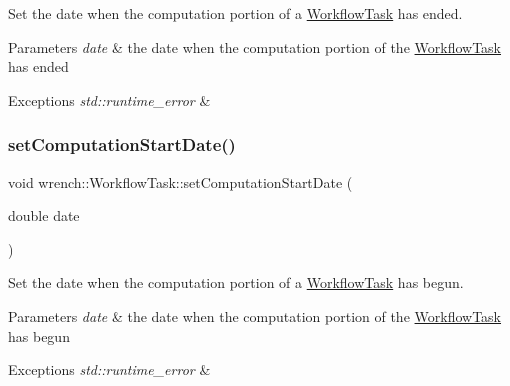 Set the date when the computation portion of a \hyperlink{classwrench_1_1_workflow_task}{Workflow\+Task} has ended. 


\begin{DoxyParams}{Parameters}
{\em date} & the date when the computation portion of the \hyperlink{classwrench_1_1_workflow_task}{Workflow\+Task} has ended \\
\hline
\end{DoxyParams}

\begin{DoxyExceptions}{Exceptions}
{\em std\+::runtime\+\_\+error} & \\
\hline
\end{DoxyExceptions}
\mbox{\label{classwrench_1_1_workflow_task_ad9f7174070a9a90da70c683b507f94e7}} 
\subsubsection{\texorpdfstring{set\+Computation\+Start\+Date()}{setComputationStartDate()}}
{\footnotesize\ttfamily void wrench\+::\+Workflow\+Task\+::set\+Computation\+Start\+Date (\begin{DoxyParamCaption}\item[{double}]{date }\end{DoxyParamCaption})}



Set the date when the computation portion of a \hyperlink{classwrench_1_1_workflow_task}{Workflow\+Task} has begun. 


\begin{DoxyParams}{Parameters}
{\em date} & the date when the computation portion of the \hyperlink{classwrench_1_1_workflow_task}{Workflow\+Task} has begun \\
\hline
\end{DoxyParams}

\begin{DoxyExceptions}{Exceptions}
{\em std\+::runtime\+\_\+error} & \\
\hline
\end{DoxyExceptions}
\mbox{\label{classwrench_1_1_workflow_task_ae21597fdb24597909735883bda7544cf}} 
